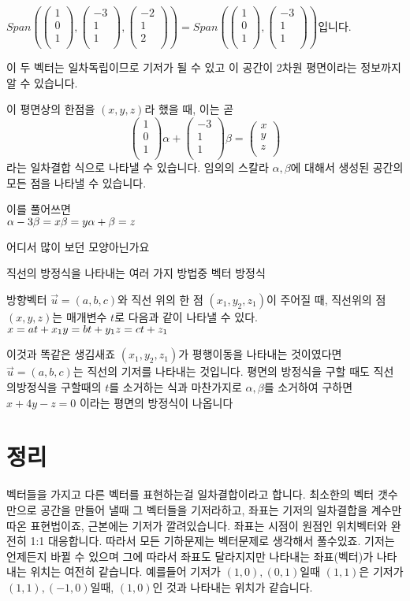 \documentclass{oblivoir}
\newcommand{\cvecthree}[3]{ \begin{pmatrix}    {#1} \\    {#2} \\    {#3} \\ \end{pmatrix}}
\begin{document}
$Span(\cvecthree{1}{0}{1},\cvecthree{-3}{1}{1},\cvecthree{-2}{1}{2}) = Span(\cvecthree{1}{0}{1},\cvecthree{-3}{1}{1})$입니다.

이 두 벡터는 일차독립이므로 기저가 될 수 있고 이 공간이 2차원 평면이라는 정보까지 알 수 있습니다.

이 평면상의 한점을 $(x,y,z)$라 했을 때, 이는 곧
\[
    \cvecthree{1}{0}{1}\alpha + \cvecthree{-3}{1}{1}\beta = \cvecthree{x}{y}{z}
\]
라는 일차결합 식으로 나타낼 수 있습니다. 임의의 스칼라 $\alpha, \beta$에 대해서 생성된 공간의 모든 점을 나타낼 수 있습니다.

이를 풀어쓰면\\
$
\alpha -3 \beta = x\\
\beta = y \\
\alpha + \beta = z
$


어디서 많이 보던 모양아닌가요

직선의 방정식을 나타내는 여러 가지 방법중
벡터 방정식
\begin{dfn}
    방향벡터 $\vec{u} = (a, b, c)$와 직선 위의 한 점 $(x_1, y_2, z_1)$이 주어질 때, 직선위의 점 $(x,y,z)$는 매개변수 $t$로 다음과 같이 나타낼 수 있다.\\
    $
    x = at + x_1 \\
    y = bt + y_1 \\
    z = ct + z_1
    $
\end{dfn}

이것과 똑같은 생김새죠
$(x_1, y_2, z_1)$가 평행이동을 나타내는 것이였다면 $\vec{u} = (a, b, c)$는 직선의 기저를 나타내는 것입니다.
평면의 방정식을 구할 때도 직선의방정식을 구할때의 $t$를 소거하는 식과 마찬가지로 $\alpha, \beta$를 소거하여 구하면 $x+4y-z=0$ 이라는 평면의 방정식이 나옵니다

\section{정리}

벡터들을 가지고 다른 벡터를 표현하는걸 일차결합이라고 합니다. 
최소한의 벡터 갯수만으로 공간을 만들어 낼때 그 벡터들을 기저라하고, 좌표는 기저의 일차결합을 계수만 따온 표현법이죠, 근본에는 기저가 깔려있습니다.
좌표는 시점이 원점인 위치벡터와 완전히 1:1 대응합니다. 따라서 모든 기하문제는 벡터문제로 생각해서 풀수있죠.
기저는 언제든지 바뀔 수 있으며 그에 따라서 좌표도 달라지지만 나타내는 좌표(벡터)가 나타내는 위치는 여전히 같습니다.
예를들어 기저가 $(1,0), (0,1)$일때 $(1,1)$은 기저가 $(1,1), (-1, 0)$일때, $(1,0)$인 것과 나타내는 위치가 같습니다.


 
\end{document}
